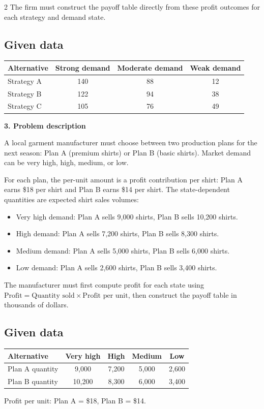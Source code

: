 \documentclass[12pt]{article}
\newcommand{\SubsectionBox}[1]{%
	\noindent\colorbox{gray!30}{%
		\parbox{\linewidth}{\textbf{#1}}%
	}\par\vspace{0.35cm}%
}
\begin{document}
\begin{multicols}{2}
				The firm must construct the payoff table directly from these profit outcomes for each strategy and demand state.
				\subsection*{Given data}
				\begin{center}
					\begin{tabular}{l c c c}
						\toprule
						Alternative & Strong demand & Moderate demand & Weak demand \\
						\midrule
						Strategy A & 140 & 88 & 12 \\
						Strategy B & 122 & 94 & 38 \\
						Strategy C & 105 & 76 & 49 \\
						\bottomrule
					\end{tabular}
				\end{center}

		\vspace{0.25cm}
		\SubsectionBox{3. Problem description}\vspace{-0.25cm}
		A local garment manufacturer must choose between two production plans for the next season: Plan A (premium shirts)
				or Plan B (basic shirts). Market demand can be very high, high, medium, or low.
				
				For each plan, the per-unit amount is a profit contribution per shirt: Plan A earns \$18 per shirt and Plan B earns \$14 per shirt.
				The state-dependent quantities are expected shirt sales volumes:
				\begin{itemize}
					\item Very high demand: Plan A sells 9{,}000 shirts, Plan B sells 10{,}200 shirts.
					\item High demand: Plan A sells 7{,}200 shirts, Plan B sells 8{,}300 shirts.
					\item Medium demand: Plan A sells 5{,}000 shirts, Plan B sells 6{,}000 shirts.
					\item Low demand: Plan A sells 2{,}600 shirts, Plan B sells 3{,}400 shirts.
				\end{itemize}
				
				The manufacturer must first compute profit for each state using
				\(\text{Profit}=\text{Quantity sold}\times\text{Profit per unit}\), then construct the payoff table in thousands of dollars.
				\subsection*{Given data}
				\begin{center}
					\begin{tabular}{l c c c c}
						\toprule
						Alternative & Very high & High & Medium & Low \\
						\midrule
						Plan A quantity & 9{,}000 & 7{,}200 & 5{,}000 & 2{,}600 \\
						Plan B quantity & 10{,}200 & 8{,}300 & 6{,}000 & 3{,}400 \\
						\bottomrule
					\end{tabular}
				\end{center}
				Profit per unit: Plan A = \$18, Plan B = \$14.


\end{multicols}
\end{document}
